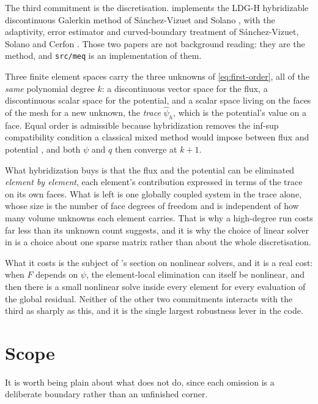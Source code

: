 The third commitment is the discretisation. {\meq} implements the LDG-H
hybridizable discontinuous Galerkin method of S\'anchez-Vizuet and Solano
\cite{SanchezVizuetSolano2019}, with the adaptivity, error estimator and
curved-boundary treatment of S\'anchez-Vizuet, Solano and Cerfon
\cite{SanchezVizuet2020adaptive}. Those two papers are not background reading:
they are the method, and \texttt{src/meq} is an implementation of them.

Three finite element spaces carry the three unknowns of \eqref{eq:first-order},
all of the \emph{same} polynomial degree $k$: a discontinuous vector space for
the flux, a discontinuous scalar space for the potential, and a scalar space
living on the faces of the mesh for a new unknown, the \emph{trace}
$\hat\psi_h$, which is the potential's value on a face. Equal order is
admissible because hybridization removes the inf-sup compatibility condition a
classical mixed method would impose between flux and potential
\cite{CockburnGopalakrishnanLazarov2009}, and both $\psi$ and $q$ then converge
at $k+1$.

What hybridization buys is that the flux and the potential can be eliminated
\emph{element by element}, each element's contribution expressed in terms of the
trace on its own faces. What is left is one globally coupled system in the trace
alone, whose size is the number of face degrees of freedom and is independent of
how many volume unknowns each element carries. That is why a high-degree run
costs far less than its unknown count suggests, and it is why the choice of
linear solver in  is a choice about one sparse matrix rather
than about the whole discretisation.

What it costs is the subject of 's section on nonlinear solvers,
and it is a real cost: when $F$ depends on $\psi$, the element-local elimination
can itself be nonlinear, and then there is a small nonlinear solve inside every
element for every evaluation of the global residual. Neither of the other two
commitments interacts with the third as sharply as this, and it is the single
largest robustness lever in the code.

\section{Scope}

It is worth being plain about what {\meq} does not do, since each omission is a
deliberate boundary rather than an unfinished corner.

